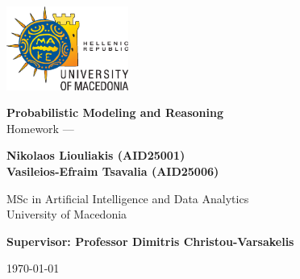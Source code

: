 \begin{titlepage}
    \centering

    \vfill
    \includegraphics[width=0.3\textwidth]{UOMLOGOEN.eps}
    \vfill

    {\Huge \textbf{Probabilistic Modeling and Reasoning}} \\
    {\LARGE Homework — \HomeworkNumber}

    \vfill  %
    {\Large \textbf{Nikolaos Liouliakis (AID25001)}} \\
    {\Large \textbf{Vasileios-Efraim Tsavalia (AID25006)}}



    \vfill

    {\Large MSc in Artificial Intelligence and Data Analytics} \\
    {\Large University of Macedonia}

    \vfill


    {\Large \textbf{Supervisor: Professor Dimitris Christou-Varsakelis}}

    \vfill

    {\Large \monthyeardate\today} %
    
\end{titlepage}


\newpage
